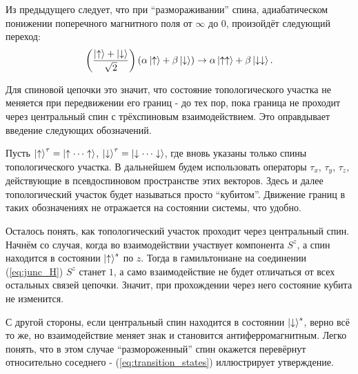 \documentclass[a4paper,12pt]{article}
\theoremstyle{plain} %
\theoremstyle{definition} %
\theoremstyle{remark} %
\begin{document}
Из предыдущего следует, что при ``размораживании'' спина, адиабатическом понижении поперечного магнитного поля от $\infty$ до $0$, произойдёт следующий переход:
\begin{equation*}
    \left( \frac{\ket{\uparrow} + \ket{\downarrow}}{\sqrt{2}} \right) (\alpha \ket{\uparrow} + \beta \ket{\downarrow}) \rightarrow \alpha \ket{\uparrow\uparrow} + \beta \ket{\downarrow\downarrow}.
\end{equation*}

Для спиновой цепочки это значит, что состояние топологического участка не меняется при передвижении его границ -  до тех пор, пока граница не проходит через центральный спин с трёхспиновым взаимодействием. Это оправдывает введение следующих обозначений.

Пусть $\ket{\uparrow}^\tau = \ket{\uparrow \dotsm \uparrow}$, $\ket{\downarrow}^\tau = \ket{\downarrow \dotsm \downarrow}$, где вновь указаны только спины топологического участка. В дальнейшем будем использовать операторы $\tau_x$, $\tau_y$, $\tau_z$, действующие в псевдоспиновом пространстве этих векторов. Здесь и далее топологический участок будет называться просто ``кубитом''. Движение границ в таких обозначениях не отражается на состоянии системы, что удобно. 

Осталось понять, как топологический участок проходит через центральный спин. Начнём со случая, когда во взаимодействии участвует компонента $S^z$, а спин находится в состоянии $\ket{\uparrow}^s$ по $z$. Тогда в гамильтониане на соединении (\ref{eq:junc_H}) $S^z$ станет $1$, а само взаимодействие не будет отличаться от всех остальных связей цепочки. Значит, при прохождении через него состояние кубита не изменится.

С другой стороны, если центральный спин находится в состоянии $\ket{\downarrow}^s$, верно всё то же, но взаимодействие меняет знак и становится антиферромагнитным. Легко понять, что в этом случае ``размороженный'' спин окажется перевёрнут относительно соседнего - (\ref{eq:transition_states}) иллюстрирует утверждение.
\end{document}
